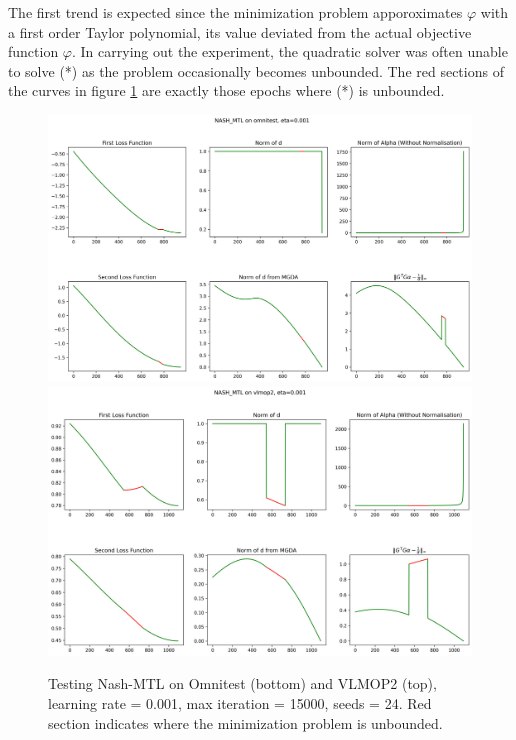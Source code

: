 \documentclass{article}
\renewcommand{\|}{\biggr|}
\begin{document}
    The first trend is expected since the minimization problem apporoximates $\varphi$ with a first order Taylor polynomial, its value deviated from the actual objective function $\varphi$. In carrying out the experiment, the quadratic solver was often unable to solve (*) as the problem occasionally becomes unbounded. The red sections of the curves in figure \ref{nash_mtl_exp_1} are exactly those epochs where (*) is unbounded. 
    \begin{figure}
        \includegraphics[scale = 0.4]{src/example1.png}
        \includegraphics[scale = 0.4]{src/example2.png}
        \caption{Testing Nash-MTL on Omnitest (bottom) and VLMOP2 (top), learning rate = 0.001, max iteration = 15000, seeds = 24. Red section indicates where the minimization problem is unbounded.}\label{nash_mtl_exp_1}
    \end{figure}
\end{document}
